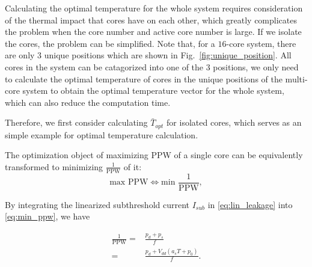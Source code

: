 Calculating the optimal temperature for the whole system requires consideration of the thermal impact that cores have on each other, which greatly complicates the problem when the core number and active core number is large. 
If we isolate the cores, the problem can be simplified. Note that, for a $16$-core system, there are only $3$ unique positions which are shown in Fig.~\ref{fig:unique_position}. All cores in the system can be catagorized into one of the $3$ positions, we only need to calculate the optimal temperature of cores in the unique positions of the multi-core system to obtain the optimal temperature vector for the whole system, which can also reduce the computation time.

Therefore, we first consider calculating $\bar{T}_{opt}$ for isolated cores, which serves as an simple example for optimal temperature calculation.




The optimization object of maximizing PPW of a single core can be equivalently transformed to minimizing $\frac{1}{\text{PPW}}$ of it:
\begin{equation}\label{eq:min_ppw}
\text{max PPW}\Longleftrightarrow \text{min } \frac{1}{\text{PPW}},
\end{equation}

By integrating the linearized subthreshold current $I_{sub}$ in \eqref{eq:lin_leakage} into \eqref{eq:min_ppw}, we have

\begin{equation}\label{eq:1_ppw}
\begin{split}
\frac{1}{\text{PPW}} = &\frac{p_{d}+p_{s}}{f}\\
= &\frac{p_{d}+V_{dd}(a_{s}T+p_{0})}{f}.
\end{split}
\end{equation}


